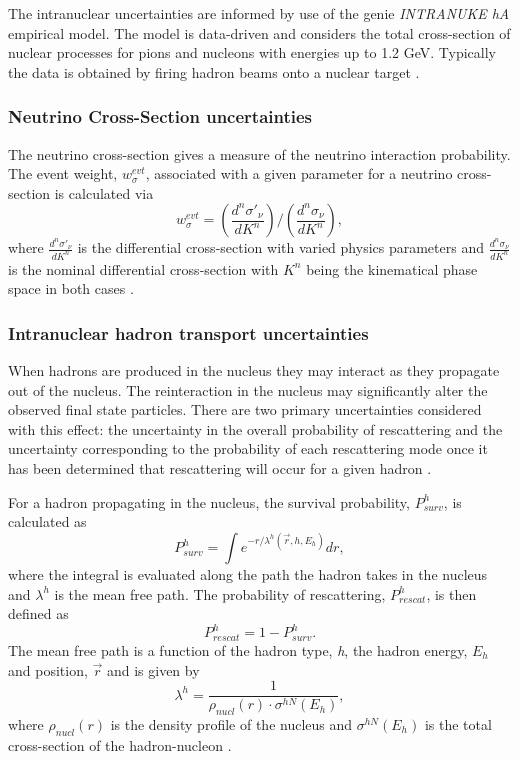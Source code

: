 The intranuclear uncertainties are informed by use of the \gls{genie}  \textit{INTRANUKE hA} empirical model. The model is data-driven and considers the total cross-section of nuclear processes for pions and nucleons with energies up to 1.2 GeV. Typically the data is obtained by firing hadron beams onto a nuclear target \cite{GENIE_manual}\cite{GENIE_tune_CC0pi} \cite{Comparison_of_validation_methods_of_simulations_for_final_state_interactions_in_hadron_production_experiments}.

\subsubsection*{Neutrino Cross-Section uncertainties}

The neutrino cross-section gives a measure of the neutrino interaction probability. The event weight, $w_{\sigma}^{evt}$, associated with a given parameter for a neutrino cross-section is calculated via
\begin{equation}
    w_\sigma^{evt} = \left(\frac{d^n\sigma'_\nu}{dK^n}\right)\Bigg/\left(\frac{d^n\sigma_\nu}{dK^n}\right),
\end{equation}
where $\frac{d^n\sigma'_\nu}{dK^n}$ is the differential cross-section with varied physics parameters and  $\frac{d^n\sigma_\nu}{dK^n}$ is the nominal differential cross-section with $K^n$ being the kinematical phase space in both cases \cite{GENIE_manual}.

\subsubsection*{Intranuclear hadron transport uncertainties}
When hadrons are produced in the nucleus they may interact as they propagate out of the nucleus. The reinteraction in the nucleus may significantly alter the observed final state particles. There are two primary uncertainties considered with this effect: the uncertainty in the overall probability of rescattering and the uncertainty corresponding to the probability of each rescattering mode once it has been determined that rescattering will occur for a given hadron \cite{GENIE_manual}. 

For a hadron propagating in the nucleus, the survival probability, $P_{surv}^h$, is calculated as
\begin{equation}
    P_{surv}^h = \int e^{-r/ \lambda^h(\vec r, h, E_h)} dr,
\label{eq:intranuclear_survival_prob}
\end{equation}
where the integral is evaluated along the path the hadron takes in the nucleus and $\lambda^h$ is the mean free path. The probability of rescattering, $P^h_{rescat}$, is then defined as 
\begin{equation}
    P_{rescat}^h = 1 - P_{surv}^h.
\end{equation}
The mean free path is a function of the hadron type, \textit{h}, the hadron energy, $E_h$ and position, $\vec r$ and is given by
\begin{equation}
    \lambda^h = \frac{1}{\rho_{nucl}(r) \cdot \sigma^{hN}(E_h)},
\end{equation}
where $\rho_{nucl}(r)$ is the density profile of the nucleus and $\sigma^{hN}(E_h)$ is the total cross-section of the hadron-nucleon \cite{GENIE_manual}. 

